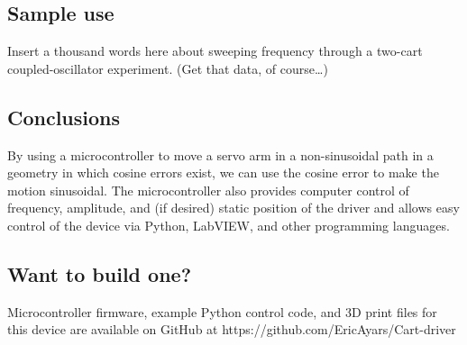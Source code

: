 \documentclass[11 pt]{article}
\begin{document}
\subsection*{Sample use}
Insert a thousand words here about sweeping frequency through a two-cart coupled-oscillator experiment. 
(Get that data, of course\ldots)

\subsection*{Conclusions}
By using a microcontroller to move a servo arm in a non-sinusoidal path in a geometry in which cosine errors exist, we can use the cosine error to make the motion sinusoidal.
The microcontroller also provides computer control of frequency, amplitude, and (if desired) static position of the driver and allows easy control of the device via Python, LabVIEW, and other programming languages.

\subsection*{Want to build one?}
Microcontroller firmware, example Python control code, and 3D print files for this device are available on GitHub at https://github.com/EricAyars/Cart-driver
\end{document}
